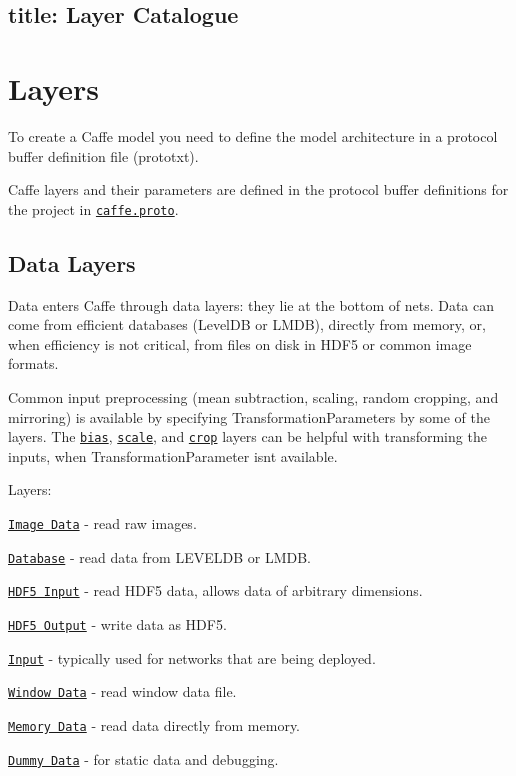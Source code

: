 

 \subsection*{title\+: Layer Catalogue }

\section*{Layers}

To create a Caffe model you need to define the model architecture in a protocol buffer definition file (prototxt).

Caffe layers and their parameters are defined in the protocol buffer definitions for the project in \href{https://github.com/BVLC/caffe/blob/master/src/caffe/proto/caffe.proto}{\tt caffe.\+proto}.

\subsection*{Data Layers}

Data enters Caffe through data layers\+: they lie at the bottom of nets. Data can come from efficient databases (Level\+DB or L\+M\+DB), directly from memory, or, when efficiency is not critical, from files on disk in H\+D\+F5 or common image formats.

Common input preprocessing (mean subtraction, scaling, random cropping, and mirroring) is available by specifying {\ttfamily Transformation\+Parameter}s by some of the layers. The \href{layers/bias.html}{\tt bias}, \href{layers/scale.html}{\tt scale}, and \href{layers/crop.html}{\tt crop} layers can be helpful with transforming the inputs, when {\ttfamily Transformation\+Parameter} isn\textquotesingle{}t available.

Layers\+:


\begin{DoxyItemize}
\item \href{layers/imagedata.html}{\tt Image Data} -\/ read raw images.
\item \href{layers/data.html}{\tt Database} -\/ read data from L\+E\+V\+E\+L\+DB or L\+M\+DB.
\item \href{layers/hdf5data.html}{\tt H\+D\+F5 Input} -\/ read H\+D\+F5 data, allows data of arbitrary dimensions.
\item \href{layers/hdf5output.html}{\tt H\+D\+F5 Output} -\/ write data as H\+D\+F5.
\item \href{layers/input.html}{\tt Input} -\/ typically used for networks that are being deployed.
\item \href{layers/windowdata.html}{\tt Window Data} -\/ read window data file.
\item \href{layers/memorydata.html}{\tt Memory Data} -\/ read data directly from memory.
\item \href{layers/dummydata.html}{\tt Dummy Data} -\/ for static data and debugging.
\end{DoxyItemize}

